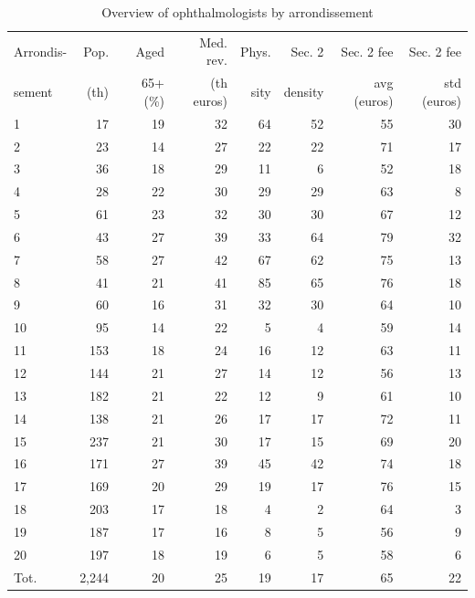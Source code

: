 \documentclass[11pt]{article}
\begin{document}
\begin{table}[h]
\caption{Overview of ophthalmologists by arrondissement}
\label{tab:Ophthalmo_stats_des}
\begin{tabular}{lrrrrrrr}
\hline
\hline
Arrondis-      & Pop.      & Aged       & Med. rev.  & Phys.  & Sec. 2  & Sec. 2 fee  & Sec. 2 fee  \\
sement         & (th)      & 65+ (\%)   & (th euros) & sity   & density & avg (euros) & std (euros) \\
\hline
1     & 17    & 19    & 32    & 64    & 52    & 55    & 30 \\
2     & 23    & 14    & 27    & 22    & 22    & 71    & 17 \\
3     & 36    & 18    & 29    & 11    & 6     & 52    & 18 \\
4     & 28    & 22    & 30    & 29    & 29    & 63    & 8 \\
5     & 61    & 23    & 32    & 30    & 30    & 67    & 12 \\
6     & 43    & 27    & 39    & 33    & 64    & 79    & 32 \\
7     & 58    & 27    & 42    & 67    & 62    & 75    & 13 \\
8     & 41    & 21    & 41    & 85    & 65    & 76    & 18 \\
9     & 60    & 16    & 31    & 32    & 30    & 64    & 10 \\
10    & 95    & 14    & 22    & 5     & 4     & 59    & 14 \\
11    & 153   & 18    & 24    & 16    & 12    & 63    & 11 \\
12    & 144   & 21    & 27    & 14    & 12    & 56    & 13 \\
13    & 182   & 21    & 22    & 12    & 9     & 61    & 10 \\
14    & 138   & 21    & 26    & 17    & 17    & 72    & 11 \\
15    & 237   & 21    & 30    & 17    & 15    & 69    & 20 \\
16    & 171   & 27    & 39    & 45    & 42    & 74    & 18 \\
17    & 169   & 20    & 29    & 19    & 17    & 76    & 15 \\
18    & 203   & 17    & 18    & 4     & 2     & 64    & 3 \\
19    & 187   & 17    & 16    & 8     & 5     & 56    & 9 \\
20    & 197   & 18    & 19    & 6     & 5     & 58    & 6 \\
\hline
Tot. & 2,244  & 20    & 25    & 19    & 17    & 65    & 22 \\
\hline
\hline
\end{tabular}%
\end{table}
\end{document}
